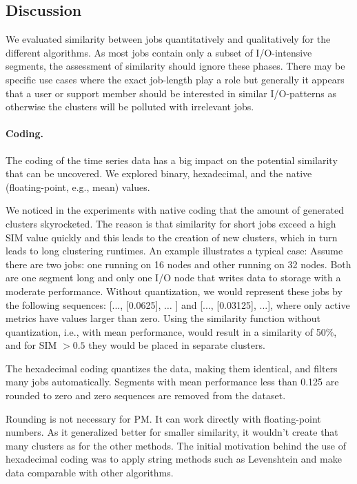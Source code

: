 \documentclass{jhps}
\begin{document}
\FloatBarrier
\subsection{Discussion}
We evaluated similarity between jobs quantitatively and qualitatively for the different algorithms.
As most jobs contain only a subset of I/O-intensive segments, the assessment of similarity should ignore these phases.
There may be specific use cases where the exact job-length play a role but generally it appears that a user or support member should be interested in similar I/O-patterns as otherwise the clusters will be polluted with  irrelevant jobs.

\paragraph{Coding.} The coding of the time series data has a big impact on the potential similarity that can be uncovered.
We explored binary, hexadecimal, and the native (floating-point, e.g., mean) values.

We noticed in the experiments with native coding that the amount of generated clusters skyrocketed.
The reason is that similarity for short jobs exceed a high SIM value quickly and this leads to the creation of new clusters, which in turn leads to long clustering runtimes.
An example illustrates a typical case:
Assume there are two jobs: one running on 16 nodes and other running on 32 nodes.
Both are one segment long and only one I/O node that writes data to storage with a moderate performance.
Without quantization, we would represent these jobs by the following sequences:  [..., [0.0625], $ \ldots $ ] and [..., [0.03125], ...], where only active metrics have values larger than zero.
Using the similarity function without quantization, i.e., with mean performance, would result in a similarity of 50$\%$, and for SIM $>0.5$ they would be placed in separate clusters.

The hexadecimal coding quantizes the data, making them identical, and filters many jobs automatically.
Segments with mean performance less than 0.125 are rounded to zero and zero sequences are removed from the dataset.

Rounding is not necessary for PM.
It can work directly with floating-point numbers.
As it generalized better for smaller similarity, it wouldn't create that many clusters as for the other methods.
The initial motivation behind the use of hexadecimal coding was to apply string methods such as Levenshtein and make data comparable with other algorithms.
\end{document}

